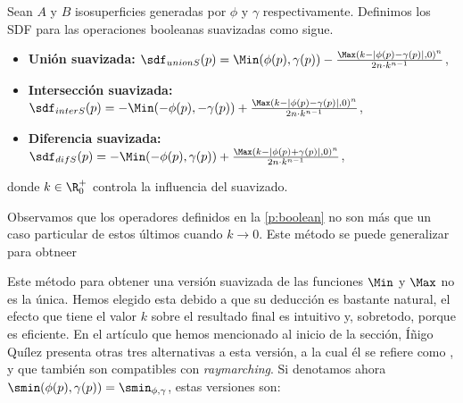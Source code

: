 
\begin{definicion}
    Sean $A$ y $B$ isosuperficies generadas por $\phi$ y $\gamma$ respectivamente. Definimos los SDF para las operaciones booleanas suavizadas como sigue.
    \begin{itemize}
        \item \textbf{Unión suavizada: } $\sdf_{unionS}(p) = \Min(\phi(p),\gamma(p)) - \frac{\Max\left( k - |\phi(p) - \gamma(p)|, 0\right)^n}{2n\cdot k^{n-1}}$,
        \item \textbf{Intersección suavizada: } $\sdf_{interS}(p) = -\Min(-\phi(p),-\gamma(p)) + \frac{\Max\left( k - |\phi(p) - \gamma(p)|, 0\right)^n}{2n\cdot k^{n-1}}$,
        \item \textbf{Diferencia suavizada: } $\sdf_{difS}(p) = -\Min(-\phi(p),\gamma(p)) + \frac{\Max\left( k - |\phi(p) + \gamma(p)|, 0\right)^n}{2n\cdot k^{n-1}}$,
    \end{itemize}

    donde $k\in \R^+_0$ controla la influencia del suavizado.        
\end{definicion}

Observamos que los operadores definidos en la \autoref{p:boolean} no son más que un caso particular de estos últimos cuando $k\to 0$. Este método se puede generalizar para obtneer\newline


Este método para obtener una versión suavizada de las funciones $\Min$ y $\Max$ no es la única. Hemos elegido esta debido a que su deducción es bastante natural, el efecto que tiene el valor $k$ sobre el resultado final es intuitivo y, sobretodo, porque es eficiente. En el artículo que hemos mencionado al inicio de la sección, Íñigo Quílez \cite{article:smooth} presenta otras tres alternativas a esta versión, a la cual él se refiere como , y que también son compatibles con \textit{raymarching}. Si denotamos ahora $\smin(\phi(p), \gamma(p)) = \smin_{\phi,\gamma}$, estas versiones son:

